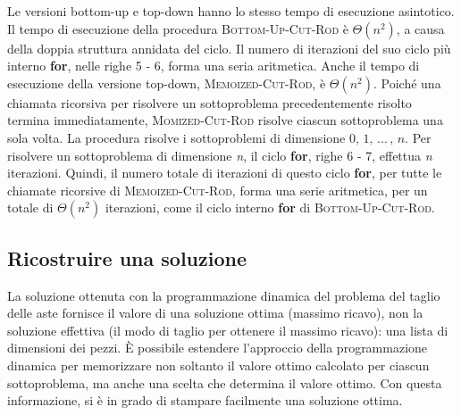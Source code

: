 \documentclass[10pt, a4paper]{report}
\begin{document}
Le versioni bottom-up e top-down hanno lo stesso tempo di esecuzione asintotico. Il tempo di esecuzione della procedura \textsc{Bottom-Up-Cut-Rod} è $\Theta(n^2)$, a causa della doppia struttura annidata del ciclo. Il numero di iterazioni del suo ciclo più interno \textbf{for}, nelle righe 5 - 6, forma una seria aritmetica. Anche il tempo di esecuzione della versione top-down, \textsc{Memoized-Cut-Rod}, è $\Theta(n^2)$. Poiché una chiamata ricorsiva per risolvere un sottoproblema precedentemente risolto termina immediatamente, \textsc{Momized-Cut-Rod} risolve ciascun sottoproblema una sola volta. La procedura risolve i sottoproblemi di dimensione $0,\,1,\,...\,,\,n$. Per risolvere un sottoproblema di dimensione \textit{n}, il ciclo \textbf{for}, righe 6 - 7, effettua \textit{n} iterazioni. Quindi, il numero totale di iterazioni di questo ciclo \textbf{for}, per tutte le chiamate ricorsive di \textsc{Memoized-Cut-Rod}, forma una serie aritmetica, per un totale di $\Theta(n^2)$ iterazioni, come il ciclo interno \textbf{for} di \textsc{Bottom-Up-Cut-Rod}.
\subsection{Ricostruire una soluzione}
La soluzione ottenuta con la programmazione dinamica del problema del taglio delle aste fornisce il valore di una soluzione ottima (massimo ricavo), non la soluzione effettiva (il modo di taglio per ottenere il massimo ricavo): una lista di dimensioni dei pezzi. È possibile estendere l'approccio della programmazione dinamica per memorizzare non soltanto il valore ottimo calcolato per ciascun sottoproblema, ma anche una scelta che determina il valore ottimo. Con questa informazione, si è in grado di stampare facilmente una soluzione ottima.
\end{document}
